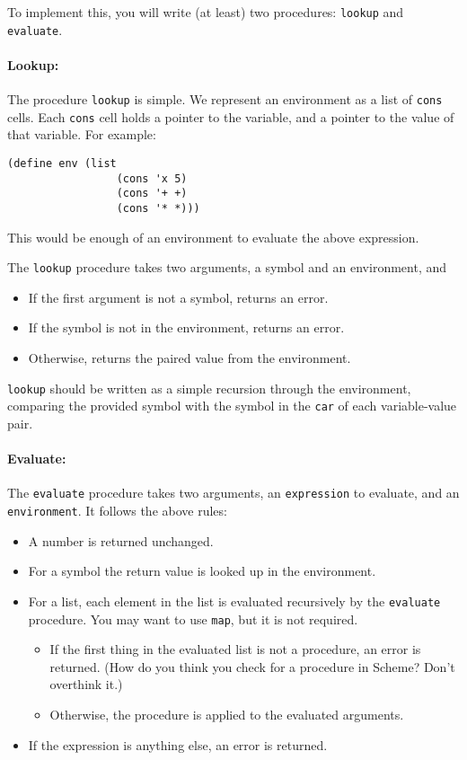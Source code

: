 \documentclass{article}
\begin{document}
To implement this,  you will write (at least) two procedures:
          {\tt lookup} and {\tt evaluate}.

\paragraph{Lookup:}
The procedure {\tt lookup} is simple.  We represent an environment as
a list of {\tt cons} cells.  Each {\tt cons}
cell holds a pointer to the variable,
and a pointer to the value of that variable. For example:
\begin{Verbatim}[frame=single]
  (define env (list
                 (cons 'x 5)
                 (cons '+ +)
                 (cons '* *)))
\end{Verbatim}
This would be enough of an environment to evaluate the above
expression.

The {\tt lookup} procedure takes two arguments, a symbol and an
environment, and
\begin{itemize}
\item If the first argument is not a symbol, returns an error.
\item If the symbol is not in the environment, returns an error.
\item Otherwise, returns the paired value from the environment.
\end{itemize}
{\tt lookup} should be written as a simple recursion through the
environment, comparing the provided symbol with the symbol in the
{\tt car} of each variable-value pair.
  
\paragraph{Evaluate:}
The {\tt evaluate} procedure takes two arguments, an {\tt expression} to
evaluate, and an {\tt environment}.  It follows the above rules:
\begin{itemize}
\item A number is returned unchanged.
\item For a symbol the return value is looked up in the environment.
\item For a list, each element in the list is evaluated recursively by
  the {\tt evaluate} procedure.  You may
  want to use {\tt map}, but it is not required.
  \begin{itemize}
  \item If the first thing in the evaluated list is not a procedure,
    an error is returned.  (How do you think you check for a procedure
    in Scheme?  Don't overthink it.)
  \item Otherwise, the procedure is applied to the evaluated
    arguments.
  \end{itemize}
\item If the expression is anything else, an error is returned.
\end{itemize}
\end{document}
